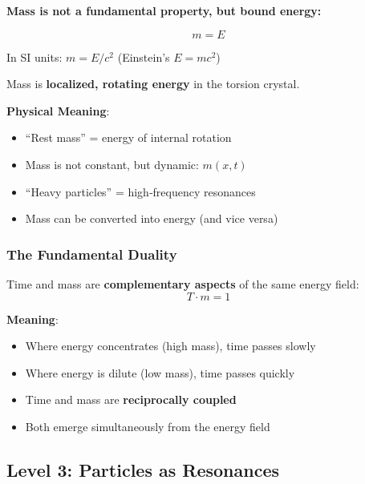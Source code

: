 	\begin{keyresult}
		\textbf{Mass is not a fundamental property, but bound energy:}
		
		\begin{equation}
			\boxed{m = E}
		\end{equation}
		
		In SI units: $m = E/c^2$ (Einstein’s $E = mc^2$)
		
		\vspace{0.3cm}
		
		Mass is \textbf{localized, rotating energy} in the torsion crystal.
	\end{keyresult}
	
	\textbf{Physical Meaning}:
	\begin{itemize}
		\item \enquote{Rest mass} = energy of internal rotation
		\item Mass is not constant, but dynamic: $m(x,t)$
		\item \enquote{Heavy particles} = high‑frequency resonances
		\item Mass can be converted into energy (and vice versa)
	\end{itemize}
	
	\subsubsection{The Fundamental Duality}
	
	Time and mass are \textbf{complementary aspects} of the same energy field:
	\begin{equation}
		\boxed{T \cdot m = 1}
	\end{equation}
	
	\textbf{Meaning}:
	\begin{itemize}
		\item Where energy concentrates (high mass), time passes slowly
		\item Where energy is dilute (low mass), time passes quickly
		\item Time and mass are \textbf{reciprocally coupled}
		\item Both emerge simultaneously from the energy field
	\end{itemize}
	
	\subsection{Level 3: Particles as Resonances}
	
